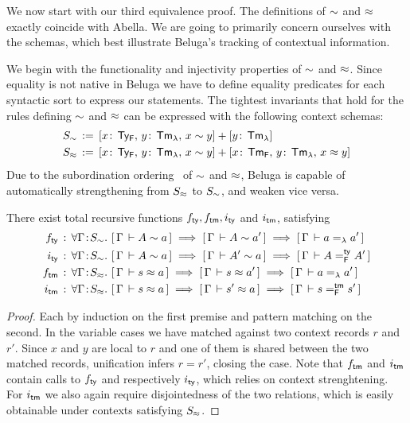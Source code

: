 We now start with our third equivalence proof.
The definitions of $\mathrel{\sim}$ and $\mathrel{\approx}$ exactly coincide with Abella.
We are going to primarily concern ourselves with the schemas, which best illustrate Beluga's tracking of contextual information.

We begin with the functionality and injectivity properties of $\mathrel{\sim}$ and $\mathrel{\approx}$.
Since equality is not native in Beluga we have to define equality predicates for each syntactic sort to express our statements. The tightest invariants that hold for the rules defining $\mathrel{\sim}$ and $\mathrel{\approx}$ can be expressed with the following context schemas:
\begin{align*}
  S_{\mathrel{\sim}} &\mathrel{\, := \,} [x\!:\,\mathsf{Ty_{F}} ,\, y\!:\,\mathsf{Tm_{\lambda}} ,\, x \mathrel{\sim} y] + [y\!:\,\mathsf{Tm_{\lambda}}]\\
  S_{\mathrel{\approx}} &\mathrel{\, := \,} [x\!:\,\mathsf{Ty_{F}} ,\, y\!:\,\mathsf{Tm_{\lambda}} ,\, x \mathrel{\sim} y] + [x\!:\,\mathsf{Tm_{F}} ,\, y\!:\,\mathsf{Tm_{\lambda}} ,\, x \mathrel{\approx} y]
\end{align*}
Due to the subordination ordering~\cite{Virga99phd} of $\mathrel{\sim}$ and $\mathrel{\approx}$, Beluga is capable of automatically strengthening from $S_{\mathrel{\approx}}$ to $S_{\mathrel{\sim}}$, and weaken vice versa.
\begin{lemma}
  There exist total recursive functions $f_{\mathsf{ty}}, f_{\mathsf{tm}}, i_{\mathsf{ty}}$ and $i_{\mathsf{tm}}$, satisfying
  \begin{align*}
    f_{\ty} &\OF  \mAll{\Gamma \of S_{\tyr}} \bc{\Gamma}{A \tyr a} \implies \bc{\Gamma}{A \tyr a'} \implies \bc{\Gamma}{a =_{\lambda} a'}\\
    i_{\ty} &\OF  \mAll{\Gamma \of S_{\tyr}} \bc{\Gamma}{A \tyr a} \implies \bc{\Gamma}{A' \tyr a} \implies \bc{\Gamma}{A =^{\ty}_{\mathsf{F}} A'}\\
    f_{\tm} &\OF  \mAll{\Gamma \of S_{\tmr}} \bc{\Gamma}{s \tmr a} \implies \bc{\Gamma}{s \tmr a'} \implies \bc{\Gamma}{a =_{\lambda} a'}\\
    i_{\tm} &\OF  \mAll{\Gamma \of S_{\tmr}} \bc{\Gamma}{s \tmr a} \implies \bc{\Gamma}{s' \tmr a} \implies \bc{\Gamma}{s =^{\tm}_{\mathsf{F}} s'}
\end{align*}
\end{lemma}
\begin{proof}
  Each by induction on the first premise and pattern matching on the second.
  In the variable cases we have matched against two context records $r$ and $r'$.
  Since $x$ and $y$ are local to $r$ and one of them is shared between the two matched records, unification infers $r = r'$, closing the case.
  Note that $f_{\mathsf{tm}}$ and $i_{\mathsf{tm}}$ contain calls to $f_{\mathsf{ty}}$ and respectively $i_{\mathsf{ty}}$, which relies on context strenghtening.
  For $i_{\mathsf{tm}}$ we also again require disjointedness of the two relations, which is easily obtainable under contexts satisfying $S_{\mathrel{\approx}}$.
\end{proof}

